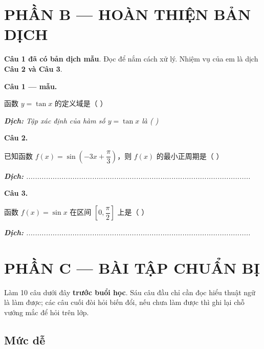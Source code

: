 \documentclass[11pt, a4paper]{article}
\begin{document}
\section{PHẦN B — HOÀN THIỆN BẢN DỊCH}

\textbf{Câu 1 đã có bản dịch mẫu}. Đọc để nắm cách xử lý. Nhiệm vụ của em là dịch \textbf{Câu 2 và Câu 3}.

\textbf{Câu 1 — mẫu.}

函数 $y = \tan x$ 的定义域是（ ）

\noindent\emph{\textbf{Dịch:} Tập xác định của hàm số $y = \tan x$ là ( )}

\textbf{Câu 2.}

已知函数 $f(x) = \sin\left(-3x + \dfrac{\pi}{3}\right)$，则 $f(x)$ 的最小正周期是（ ）

\noindent\emph{\textbf{Dịch:} ......................................................................................................}

\textbf{Câu 3.}

函数 $f(x) = \sin x$ 在区间 $\left[0, \dfrac{\pi}{2}\right]$ 上是（ ）

\noindent\emph{\textbf{Dịch:} ......................................................................................................}

\section{PHẦN C — BÀI TẬP CHUẨN BỊ}

Làm 10 câu dưới đây \textbf{trước buổi học}. Sáu câu đầu chỉ cần đọc hiểu thuật ngữ là làm được; các câu cuối đòi hỏi biến đổi, nếu chưa làm được thì ghi lại chỗ vướng mắc để hỏi trên lớp.

\subsection{Mức dễ}
\end{document}
